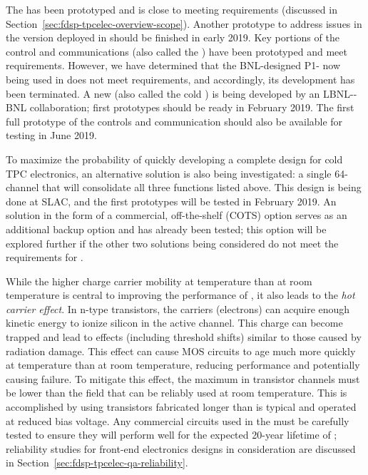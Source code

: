 The   has been prototyped and is close to meeting requirements (discussed in Section~\ref{sec:fdsp-tpcelec-overview-scope}). Another prototype to address issues in the version deployed in  should be finished in early 2019. Key portions of the control and communications  (also called the  ) have been prototyped and meet requirements.  However, we have determined that the BNL-designed P1-  now being used in  does not meet requirements, and accordingly, its development has been terminated.  A new   (also called the cold  ) is being developed by an LBNL-\fnal-BNL collaboration; first prototypes should be ready in February 2019.  The first full prototype of the controls and communication  should also be available for testing in June 2019.

To maximize the probability of quickly developing a complete design for cold TPC  electronics, an alternative solution is also being investigated: a single \num{64}-channel  that will consolidate all three functions listed above.  This design is being done at SLAC, and the first prototypes will be tested in February 2019.  An  solution in the form of a commercial, off-the-shelf (COTS) option serves as an additional backup option and has already been tested; this option will be explored further if the other two  solutions being considered do not meet the requirements for .

While the higher charge carrier mobility at  temperature than at room temperature is central to improving the performance of , it also leads to the \textit{hot carrier effect}.  In n-type  transistors, the carriers (electrons) can acquire enough kinetic energy to ionize silicon in the active channel.  This charge can become trapped and lead to effects (including threshold shifts) similar to those caused by radiation damage.  This effect can cause MOS circuits to age much more quickly at  temperature than at room temperature, reducing performance and potentially causing failure.  To mitigate this effect, the maximum \efield in transistor channels must be lower than the field that can be reliably used at room temperature.  This is accomplished by using transistors fabricated longer than is typical and operated at reduced bias voltage.  Any commercial circuits used in the  must be carefully tested to ensure they will perform well for the expected \num{20}-year lifetime of ; reliability studies for front-end electronics designs in consideration are discussed in Section~\ref{sec:fdsp-tpcelec-qa-reliability}.

